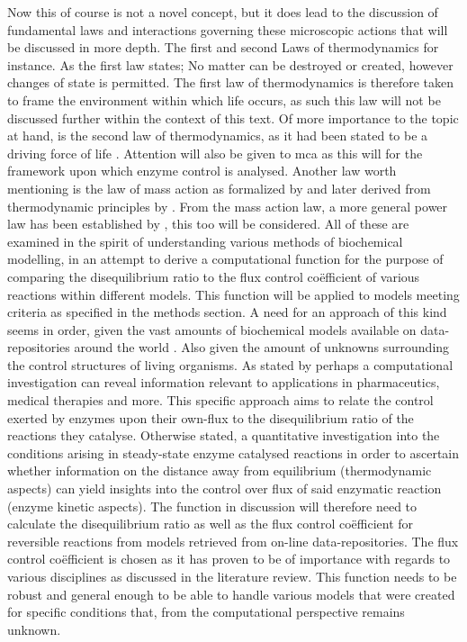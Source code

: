 Now this of course is not a novel concept, but it does lead to the discussion of fundamental laws and interactions governing these microscopic actions that will be discussed in more depth. The first and second Laws of thermodynamics for instance. As the first law states; No matter can be destroyed or created, however changes of state is permitted. The first law of thermodynamics is therefore taken to frame the environment within which life occurs, as such this law will not be discussed further within the context of this text. Of more importance to the topic at hand, is the second law of thermodynamics, as it had been stated to be a driving force of life \cite{Schneider1994}. Attention will also be given to \gls{mca} as this will for the framework upon which enzyme control is analysed. Another law worth mentioning is the law of mass action as formalized by \citeauthor{Waage1986} and later derived from thermodynamic principles by \citeauthor{VantHoff1884}. From the mass action law, a more general power law has been established by \citeauthor{Savageau1969a}, this too will be considered. All of these are examined in the spirit of understanding various methods of biochemical modelling, in an attempt to derive a computational function for the purpose of comparing the disequilibrium ratio to the flux control co\"efficient of various reactions within different models. This function will be applied to models meeting criteria as specified in the methods section.
A need for an approach of this kind seems in order, given the vast amounts of biochemical models available on data-repositories around the world \citep{Kitano2002}. Also given the amount of unknowns surrounding the control structures of living organisms. As stated by \citeauthor{Knudsen2004} perhaps a computational investigation can reveal information relevant to applications in pharmaceutics, medical therapies and more. This specific approach aims to relate the control exerted by enzymes upon their own-flux to the disequilibrium ratio of the reactions they catalyse. Otherwise stated, a quantitative investigation into the conditions arising in \gls{steady-state} enzyme catalysed reactions in order to ascertain whether information on the distance away from equilibrium (thermodynamic aspects) can yield insights into the control over flux of said enzymatic reaction (enzyme kinetic aspects). The function in discussion will therefore need to calculate the disequilibrium ratio as well as the flux control co\"efficient for reversible reactions from models retrieved from on-line data-repositories. The flux control co\"efficient is chosen as it has proven to be of importance with regards to various disciplines as discussed in the literature review. This function needs to be robust and general enough to be able to handle various models that were created for specific conditions that, from the computational perspective remains unknown.
